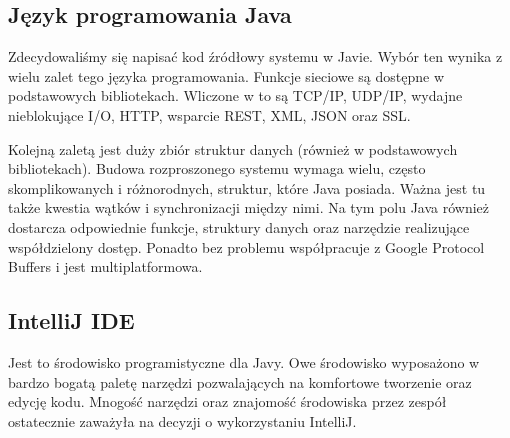 \subsection[Język programowania Java]{Język programowania Java}

\par{Zdecydowaliśmy się napisać kod źródłowy systemu w Javie. Wybór ten wynika z wielu zalet tego języka programowania. Funkcje sieciowe są dostępne w podstawowych bibliotekach. Wliczone w to są TCP/IP, UDP/IP, wydajne nieblokujące I/O, HTTP, wsparcie REST, XML, JSON oraz SSL.}

\par{Kolejną zaletą jest duży zbiór struktur danych (również w podstawowych bibliotekach). Budowa rozproszonego systemu wymaga wielu, często skomplikowanych i różnorodnych, struktur, które Java posiada. Ważna jest tu także kwestia wątków i synchronizacji między nimi. Na tym polu Java również dostarcza odpowiednie funkcje, struktury danych oraz narzędzie realizujące współdzielony dostęp. Ponadto bez problemu współpracuje z Google Protocol Buffers i jest multiplatformowa.}

\subsection[IntelliJ IDE]{IntelliJ IDE}

\par{Jest to środowisko programistyczne dla Javy. Owe środowisko wyposażono w bardzo bogatą paletę narzędzi pozwalających na komfortowe tworzenie oraz edycję kodu. Mnogość narzędzi oraz znajomość środowiska przez zespół ostatecznie zaważyła na decyzji o wykorzystaniu IntelliJ.}


